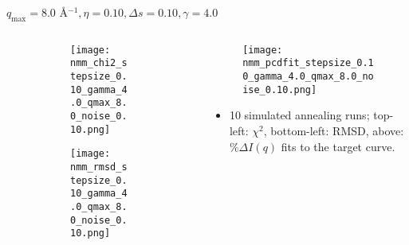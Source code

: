 \documentclass{beamer}
\begin{document}
\begin{frame}{$ q_{\textrm{max}}=8.0 $ \AA $^{-1}, \eta=0.10, \Delta s=0.10, \gamma=4.0$}
	\begin{columns}
		\begin{column}{.5\textwidth}
			\begin{figure}[H]
			\centering
			\begin{subfigure}[b]{\textwidth}
				\centering
				\texttt{[image: nmm\_chi2\_stepsize\_0.10\_gamma\_4.0\_qmax\_8.0\_noise\_0.10.png]}
				\label{fig:}
			\end{subfigure}
			\begin{subfigure}[b]{\textwidth}
				\centering
				\texttt{[image: nmm\_rmsd\_stepsize\_0.10\_gamma\_4.0\_qmax\_8.0\_noise\_0.10.png]}
				\label{fig:}
			\end{subfigure}
			\end{figure}
		\end{column}
		\begin{column}{.5\textwidth}
			\begin{figure}[H]
				\centering
				\texttt{[image: nmm\_pcdfit\_stepsize\_0.10\_gamma\_4.0\_qmax\_8.0\_noise\_0.10.png]}
				\label{fig:}
			\end{figure}
			\begin{itemize}
				\item 10 simulated annealing runs; top-left: $\chi^2$, bottom-left: RMSD, above: $\%\Delta I(q)$ fits to the target curve.
			\end{itemize}
		\end{column}
	\end{columns}
\end{frame}
 
\end{document}
